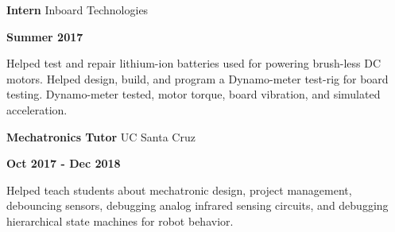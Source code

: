 \documentclass[paper=a4,fontsize=11pt]{article} %
\def \subSectionSpace   {0.25cm}     %
\def \leftColSpace      {0.1}       %
\def \middleColSpace    {0.73}       %
\def \bigMiddleColSpace {0.8}       %
\def \rightColSpace     {0.25}      %
\begin{document}
    \vspace{\subSectionSpace}  
    \noindent
    \begin{minipage}[t]{\leftColSpace\linewidth}
        \hfill
    \end{minipage}
    \begin{minipage}[t]{\middleColSpace\linewidth}
        \noindent \textbf{Intern} \quad Inboard Technologies
    \end{minipage}
    \begin{minipage}[t]{\rightColSpace\linewidth}
        \begin{flushleft}
            \noindent \textbf{Summer 2017}
        \end{flushleft}
    \end{minipage}

    \noindent
    \begin{minipage}[t]{\leftColSpace\linewidth}
        \hfill
    \end{minipage}
    \begin{minipage}[t]{\bigMiddleColSpace\linewidth}
        Helped test and repair lithium-ion batteries used for powering brush-less DC motors. Helped design, build, and program a Dynamo-meter test-rig for board testing. Dynamo-meter tested, motor torque, board vibration, and simulated acceleration.
    \end{minipage}
    
    \vspace{\subSectionSpace}
    \noindent
    \begin{minipage}[t]{\leftColSpace\linewidth}
        \noindent \hfill
    \end{minipage}
    \begin{minipage}[t]{\middleColSpace\linewidth}
        \noindent \textbf{Mechatronics Tutor} \quad UC Santa Cruz
    \end{minipage}
    \begin{minipage}[t]{\rightColSpace\linewidth}
        \noindent \textbf{Oct 2017 - Dec 2018}
    \end{minipage}

    \noindent
    \begin{minipage}[t]{\leftColSpace\linewidth}
        \hfill
    \end{minipage}
    \begin{minipage}[t]{\bigMiddleColSpace\linewidth}
        Helped teach students about mechatronic design, project management, debouncing sensors, debugging analog infrared sensing circuits, and debugging hierarchical state machines for robot behavior.
    \end{minipage}
\end{document}

